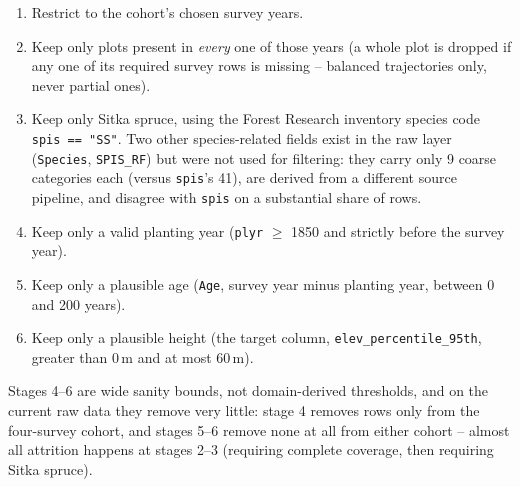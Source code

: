 \begin{enumerate}
\setlength\itemsep{0pt}
\item Restrict to the cohort's chosen survey years.
\item Keep only plots present in \emph{every} one of those years (a whole plot is dropped if any
  one of its required survey rows is missing -- balanced trajectories only, never partial ones).
\item Keep only Sitka spruce, using the Forest Research inventory species code
  \texttt{spis == "SS"}. Two other species-related fields exist in the raw layer
  (\texttt{Species}, \texttt{SPIS\_RF}) but were not used for filtering: they carry only 9 coarse
  categories each (versus \texttt{spis}'s 41), are derived from a different source pipeline, and
  disagree with \texttt{spis} on a substantial share of rows.
\item Keep only a valid planting year (\texttt{plyr} $\geq$ 1850 and strictly before the survey
  year).
\item Keep only a plausible age (\texttt{Age}, survey year minus planting year, between 0 and 200
  years).
\item Keep only a plausible height (the target column, \texttt{elev\_percentile\_95th}, greater
  than 0\,m and at most 60\,m).
\end{enumerate}

Stages 4--6 are wide sanity bounds, not domain-derived thresholds, and on the current raw data
they remove very little: stage 4 removes rows only from the four-survey cohort, and stages 5--6
remove none at all from either cohort -- almost all attrition happens at stages 2--3 (requiring
complete coverage, then requiring Sitka spruce).

\begin{table}[!htbp]
\centering
{}
\caption{Cleaning funnel, re-executed directly against the current raw GeoPackage
(\texttt{data\_processing/clean\_master\_data.py::clean\_cohort}, verified 2026-08-12).}
\label{tab:data-funnel}
\end{table}

